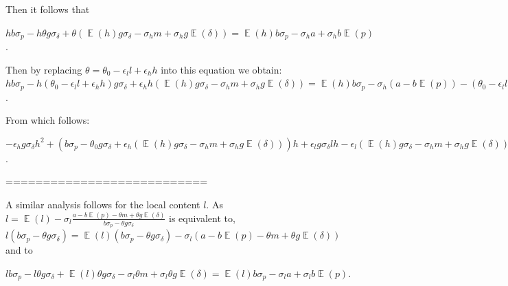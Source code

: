 \documentclass[informs]{informs3}
\begin{document}
Then it follows that

$h b\sigma_{p}-h\theta g\sigma_{\delta} +
\theta\left(\mathop{\mathbb{E}}\left(h\right)g\sigma_{\delta}
-\sigma_{h} m
+\sigma_{h} g \mathop{\mathbb{E}}\left(\delta\right)\right)=
\mathop{\mathbb{E}}\left(h\right)b\sigma_{p}-  \sigma_{h} a+\sigma_{h}b \mathop{\mathbb{E}}\left(p\right)$.


Then by replacing $\theta = \theta_0-\epsilon_l l +\epsilon_h h$ into this equation we obtain:
$h b\sigma_{p}-
h (\theta_0-\epsilon_l l +\epsilon_h h) g\sigma_{\delta} +
\epsilon_h h\left(\mathop{\mathbb{E}}\left(h\right)g\sigma_{\delta}
-\sigma_{h} m
+\sigma_{h} g \mathop{\mathbb{E}}\left(\delta\right)\right)=
\mathop{\mathbb{E}}\left(h\right)b\sigma_{p}-  \sigma_{h} \left( a-b \mathop{\mathbb{E}}\left(p\right)\right)
-
(\theta_0-\epsilon_l l)\left(\mathop{\mathbb{E}}\left(h\right)g\sigma_{\delta}
-\sigma_{h} m
+\sigma_{h} g \mathop{\mathbb{E}}\left(\delta\right)\right)$.

From which follows:

$ -\epsilon_h g\sigma_{\delta}h^{2} +\left(b\sigma_{p}-\theta_0g\sigma_{\delta} +
\epsilon_h \left(\mathop{\mathbb{E}}\left(h\right)g\sigma_{\delta}
-\sigma_{h} m
+\sigma_{h} g \mathop{\mathbb{E}}\left(\delta\right)\right)\right)h 
+\epsilon_l g\sigma_{\delta} l h -\epsilon_l \left(\mathop{\mathbb{E}}\left(h\right)g\sigma_{\delta}
-\sigma_{h} m
+\sigma_{h} g \mathop{\mathbb{E}}\left(\delta\right)\right) l
=
\mathop{\mathbb{E}}\left(h\right)b\sigma_{p}-  \sigma_{h} \left( a-b \mathop{\mathbb{E}}\left(p\right)\right)
-\theta_0\left(\mathop{\mathbb{E}}\left(h\right)g\sigma_{\delta}
-\sigma_{h} m
+\sigma_{h} g \mathop{\mathbb{E}}\left(\delta\right)\right)$.


===========================

A similar analysis follows for the local content $l$.
As $l =\mathop{\mathbb{E}}\left(l\right)-  \sigma_{l} \frac{a-b \mathop{\mathbb{E}}\left(p\right)-\theta m+\theta g \mathop{\mathbb{E}}\left(\delta\right)}{b\sigma_{p}-\theta g\sigma_{\delta}}$ is equivalent to, 
$l\left(b\sigma_{p}-\theta g\sigma_{\delta}\right) =\mathop{\mathbb{E}}\left(l\right)\left(b\sigma_{p}-\theta g\sigma_{\delta}\right)-  \sigma_{l} \left(a-b \mathop{\mathbb{E}}\left(p\right)-\theta m+\theta g \mathop{\mathbb{E}}\left(\delta\right)\right)$ and to

$l b\sigma_{p}-l\theta g\sigma_{\delta} +\mathop{\mathbb{E}}\left(l\right)\theta g\sigma_{\delta}
-\sigma_{l}\theta m
+\sigma_{l}\theta g \mathop{\mathbb{E}}\left(\delta\right)=\mathop{\mathbb{E}}\left(l\right)b\sigma_{p}-  \sigma_{l} a+\sigma_{l}b \mathop{\mathbb{E}}\left(p\right)$.
\end{document}
